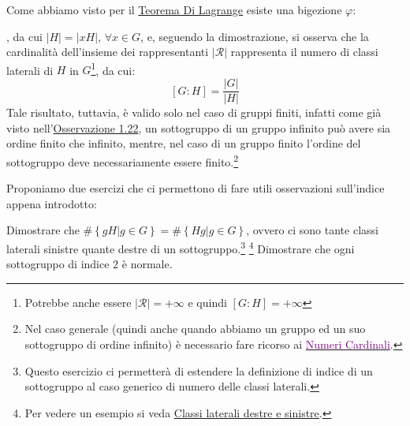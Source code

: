 \documentclass[11pt]{scrartcl}
\begin{document}
\begin{remark}
Come abbiamo visto per il \hyperref[g:Lagrange]{Teorema Di Lagrange} esiste una bigezione $\varphi:$, da cui $|H|=|xH|$, $\forall x \in G$, e, seguendo la dimostrazione, si osserva che la cardinalità dell'insieme dei rappresentanti $|\mathcal{R}|$ rappresenta il numero di classi laterali di $H$ in $G$\footnote{Potrebbe anche essere $|\mathcal{R}|=+\infty$ e quindi $[G:H]=+\infty$}, da cui:
	\[ [G:H]=\frac{|G|}{|H|}
	\]
Tale risultato, tuttavia, è valido solo nel caso di gruppi finiti, infatti come già visto nell'\hyperref[g:srg_inf]{Osservazione 1.22}, un sottogruppo di un gruppo infinito può avere sia ordine finito che infinito, mentre, nel caso di un gruppo finito l'ordine del sottogruppo deve necessariamente essere finito.\footnote{Nel caso generale (quindi anche quando abbiamo un gruppo ed un suo sottogruppo di ordine infinito) è necessario fare ricorso ai \href{http://it.wikipedia.org/wiki/Numero_cardinale}{\textcolor{purple}{Numeri Cardinali}}.}
\end{remark}

\begin{exercise}
\label{g:sxdx}
Proponiamo due esercizi che ci permettono di fare utili osservazioni sull'indice appena introdotto:
	\begin{enumerate}[(1)]
	\ii Dimostrare che $\#\left\{gH | g \in G\right\}=\#\left\{Hg | g \in G\right\}$, ovvero ci sono tante classi laterali sinistre quante destre di un sottogruppo.\footnote{Questo esercizio ci permetterà di estendere la definizione di indice di un sottogruppo al caso generico di numero delle classi laterali.} \footnote{Per vedere un esempio si veda \hyperref[A.4]{Classi laterali destre e sinistre}.}
	\ii Dimostrare che ogni sottogruppo di indice $2$ è normale.
	\end{enumerate}
\end{exercise}
\end{document}
